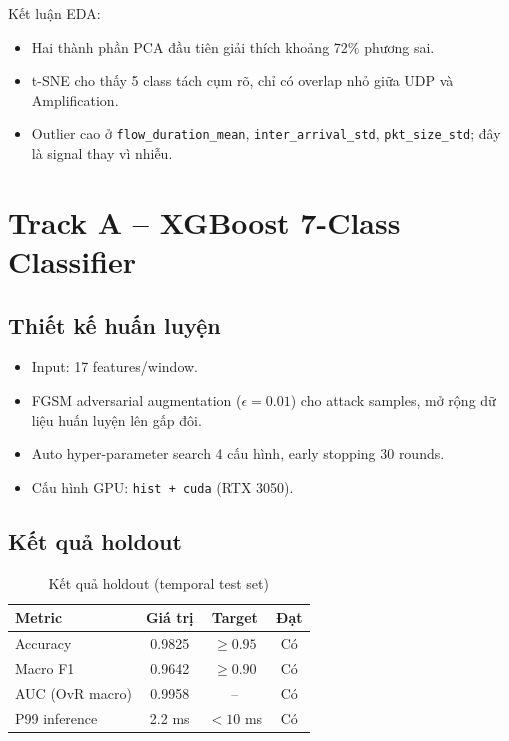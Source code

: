 \documentclass[12pt,a4paper]{article}
\begin{document}
Kết luận EDA:
\begin{itemize}[leftmargin=2em]
\item Hai thành phần PCA đầu tiên giải thích khoảng 72\% phương sai.
\item t-SNE cho thấy 5 class tách cụm rõ, chỉ có overlap nhỏ giữa UDP và Amplification.
\item Outlier cao ở \texttt{flow\_duration\_mean}, \texttt{inter\_arrival\_std}, \texttt{pkt\_size\_std}; đây là signal thay vì nhiễu.
\end{itemize}

\section{Track A -- XGBoost 7-Class Classifier}

\subsection{Thiết kế huấn luyện}
\begin{itemize}[leftmargin=2em]
\item Input: 17 features/window.
\item FGSM adversarial augmentation ($\epsilon = 0.01$) cho attack samples, mở rộng dữ liệu huấn luyện lên gấp đôi.
\item Auto hyper-parameter search 4 cấu hình, early stopping 30 rounds.
\item Cấu hình GPU: \texttt{hist + cuda} (RTX 3050).
\end{itemize}

\subsection{Kết quả holdout}
\begin{table}[H]
\centering
\caption{Kết quả holdout (temporal test set)}
\begin{tabular}{lccc}
\toprule
\textbf{Metric} & \textbf{Giá trị} & \textbf{Target} & \textbf{Đạt} \\
\midrule
Accuracy & 0.9825 & $\geq 0.95$ & Có \\
Macro F1 & 0.9642 & $\geq 0.90$ & Có \\
AUC (OvR macro) & 0.9958 & -- & Có \\
P99 inference & 2.2 ms & $< 10$ ms & Có \\
\bottomrule
\end{tabular}
\end{table}
\end{document}

